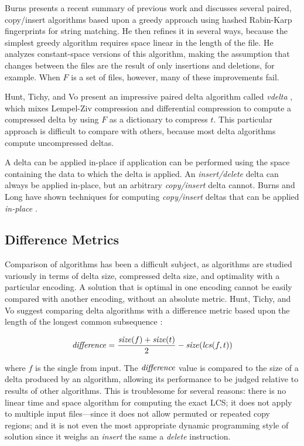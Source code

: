 \documentclass{llncs}
\begin{document}
Burns \cite{Burns:Thesis} presents a recent summary of previous work
and discusses several paired, copy/insert algorithms based upon a
greedy approach using hashed Rabin-Karp fingerprints for string
matching.  He then refines it in several ways, because the simplest
greedy algorithm requires space linear in the length of the file.  He
analyzes constant-space versions of this algorithm, making the
assumption that changes between the files are the result of only
insertions and deletions, for example.  When $F$ is a set of files,
however, many of these improvements fail.

Hunt, Tichy, and Vo present an impressive paired delta algorithm
called \emph{vdelta} \cite{Vo:1996:SCM}, which mixes Lempel-Ziv
compression and differential compression to compute a compressed delta
by using $F$ as a dictionary to compress $t$.  This particular
approach is difficult to compare with others, because most delta
algorithms compute uncompressed deltas.

A delta can be applied in-place if application can be performed using
the space containing the data to which the delta is applied.  An
\emph{insert/delete} delta can always be applied in-place, but an
arbitrary \emph{copy/insert} delta cannot.  Burns and Long have shown
techniques for computing \emph{copy/insert} deltas that can be applied
\emph{in-place} \cite{Burns:InPlace}.

\subsection{Difference Metrics} \label{sec:metrics}

Comparison of algorithms has been a difficult subject, as algorithms
are studied variously in terms of delta size, compressed delta size,
and optimality with a particular encoding.  A solution that is optimal
in one encoding cannot be easily compared with another encoding,
without an absolute metric.  Hunt, Tichy, and Vo suggest comparing
delta algorithms with a difference metric based upon the length of the
longest common subsequence \cite{Vo:1996:SCM}:

\begin{equation}
\textrm{{\emph{difference}}} = \frac{\textrm{\emph{size}}(f)+\textrm{\emph{size}}(t)}{2} - \textrm{\emph{size}}(\text{{\textrm{\emph{lcs}}}}(f,t))
\end{equation}

\noindent where $f$ is the single from input.  The $\textrm{{\emph{difference}}}$ value
is compared to the size of a delta produced by an algorithm, allowing
its performance to be judged relative to results of other algorithms.
This is troublesome for several reasons: there is no linear time and
space algorithm for computing the exact LCS; it does not apply to
multiple input files---since it does not allow permuted or repeated
copy regions; and it is not even the most appropriate dynamic
programming style of solution since it weighs an \emph{insert} the
same a \emph{delete} instruction.
\end{document}
